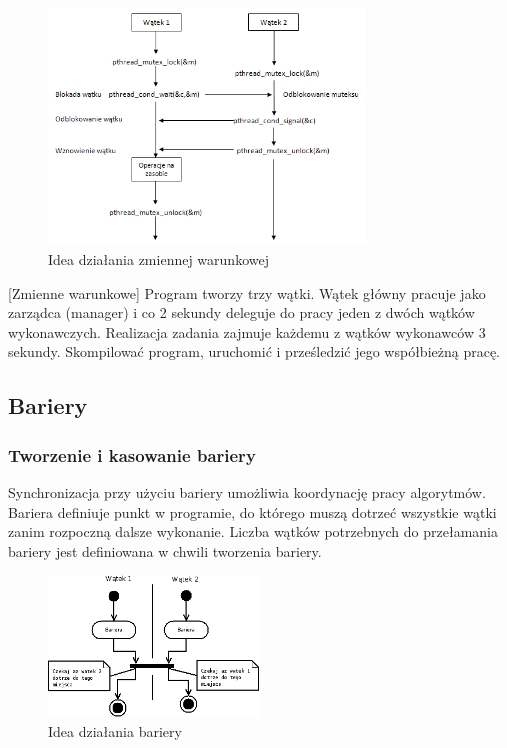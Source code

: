 \begin{figure}[!h]
\centering
\includegraphics[width=0.75\textwidth]{img/condvar}
\caption{Idea działania zmiennej warunkowej}
\label{fig:condvar}
\end{figure}

\begin{example}{[Zmienne warunkowe]}
Program tworzy trzy wątki. Wątek główny pracuje jako zarządca (manager) i co 2 sekundy deleguje do pracy jeden z dwóch wątków wykonawczych. Realizacja zadania zajmuje każdemu z wątków wykonawców 3 sekundy. Skompilować program, uruchomić i prześledzić jego współbieżną pracę.

\end{example}

\subsection{Bariery}

\subsubsection{Tworzenie i kasowanie bariery}

Synchronizacja przy użyciu bariery umożliwia koordynację pracy algorytmów. Bariera definiuje punkt w programie, do którego muszą dotrzeć wszystkie wątki zanim rozpoczną dalsze wykonanie. Liczba wątków potrzebnych do przełamania bariery jest definiowana w chwili tworzenia bariery.

\begin{figure}[!h]
\centering
\includegraphics[width=0.5\textwidth]{img/thrd_barrier}
\caption{Idea działania bariery}
\label{fig:thrd_barrier}
\end{figure}

